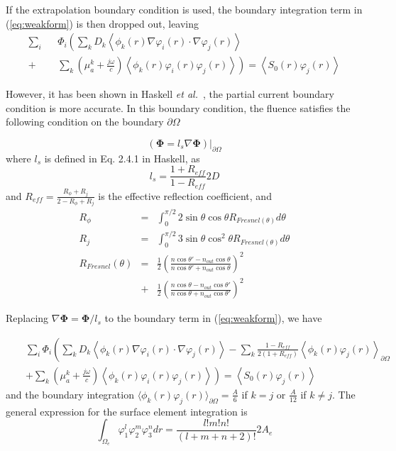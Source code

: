 \documentclass[12pt]{book}               %
\begin{document}
If the extrapolation boundary condition is used, the boundary
integration term in (\ref{eq:weakform}) is then dropped out,
leaving
\begin{eqnarray}
\label{eq:weakformzerobd}\sum_{i}&&\Phi_i\left(\sum_{k}D_k\left\langle
\phi_k(r)\nabla\varphi_i(r)\cdot\nabla\varphi_j(r)\right\rangle\right.\\\nonumber
+&&\left.\sum_{k}\left(\mu_{a}^k+\frac{j\omega}{c}\right)\left\langle\phi_k(r)\varphi_i(r)\varphi_j(r)\right\rangle\right)=\left\langle
S_0(r)\varphi_j(r)\right\rangle
\end{eqnarray}

However, it has been shown in Haskell \emph{et al.}~\cite{Haskell1994}, the partial current boundary
condition is more accurate. In this boundary condition, the fluence
satisfies the following condition on the boundary $\partial\Omega$

\begin{equation}
\label{eq:partialcurrent} \left(\boldsymbol\Phi=l_s\nabla{\boldsymbol\Phi}\right)|_{\partial\Omega}
\end{equation}
where $l_s$ is defined in Eq. 2.4.1 in Haskell, as
\begin{equation}
l_s=\frac{1+R_{eff}}{1-R_{eff}}2D
\end{equation}
and $R_{eff}=\frac{R_\phi+R_j}{2-R_\phi+R_j}$ is the effective reflection coefficient, and 
\begin{eqnarray}
R_\phi &=& \int_0^{\pi/2}2\sin \theta \cos\theta R_{Fresnel(\theta)}d\theta\\
R_j &=& \int_0^{\pi/2}3\sin \theta \cos^2\theta R_{Fresnel(\theta)}d\theta \\
R_{Fresnel}(\theta) &=& \frac{1}{2}\left(\frac{n \cos\theta' - n_{out} \cos\theta}{n \cos\theta' + n_{out} \cos\theta}\right)^2 \\
   &+&\frac{1}{2}\left(\frac{n \cos\theta - n_{out} \cos\theta'}{n \cos\theta + n_{out} \cos\theta'}\right)^2
\end{eqnarray}

Replacing $\nabla{\boldsymbol\Phi}=\boldsymbol\Phi/l_s$ to the boundary term in (\ref{eq:weakform}), we
have

\begin{eqnarray}
\label{eq:weakformpartial}\nonumber&&\sum_{i}\Phi_i\left(\sum_{k}D_k\left\langle
\phi_k(r)\nabla\varphi_i(r)\cdot\nabla\varphi_j(r)\right\rangle -
\sum_{k}\frac{1-R_{eff}}{2(1+R_{eff})}\left\langle
\phi_k(r)\varphi_j(r)\right\rangle_{\partial\Omega}\right.
\\&&\left.+\sum_{k}\left(\mu_{a}^k+\frac{j\omega}{c}\right)\left\langle\phi_k(r)\varphi_i(r)\varphi_j(r)\right\rangle\right)=\left\langle
S_0(r)\varphi_j(r)\right\rangle
\end{eqnarray}
and the boundary integration $\langle\phi_k(r)\varphi_j(r)\rangle_{\partial\Omega}=\frac{A}{6}$ if $k=j$ 
or $\frac{A}{12}$ if $k\ne j$. The general expression for the surface element integration is
\begin{equation}
\int_{\Omega_e}\varphi_1^l\varphi_2^m\varphi_3^ndr=\frac{l!m!n!}{(l+m+n+2)!}2A_e
\end{equation}
\end{document}
